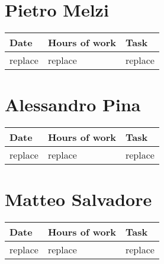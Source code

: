 
\section{Pietro Melzi}
\begin{table}[H]
	\begin{tabular}{ p{2cm} p{3cm} p{5cm}}
	Date & Hours of work & Task\\
	\hline
	replace  & replace & replace \\
	\end{tabular}
\end{table}

\section{Alessandro Pina}
\begin{table}[H]
	\begin{tabular}{ p{2cm} p{3cm} p{5cm}}
	Date & Hours of work & Task\\
	\hline
	replace  & replace & replace \\
	\end{tabular}
\end{table}

\section{Matteo Salvadore}
\begin{table}[H]
	\begin{tabular}{ p{2cm} p{3cm} p{5cm}}
	Date & Hours of work & Task\\
	\hline
	replace  & replace & replace \\
	\end{tabular}
\end{table}